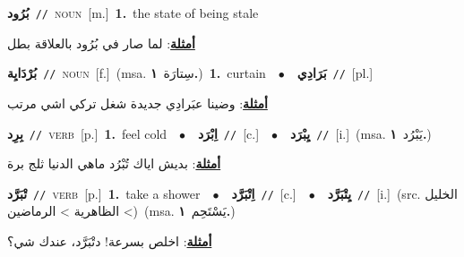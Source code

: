 \documentclass[10pt,a4paper,twoside]{article} %
\begin{document}
\begin{multicols}{2}
{\setlength\topsep{0pt}\textbf{\foreignlanguage{arabic}{بُرُود}}\ {\color{gray}\texttt{//}\color{black}}\ \textsc{noun}\ [m.]\ \textbf{1.}~the state of being stale\  \begin{flushright}\color{gray}\foreignlanguage{arabic}{\textbf{\underline{\foreignlanguage{arabic}{أمثلة}}}: لما صار في بُرُود بالعلاقة بطل}\end{flushright}\color{black}} \vspace{2mm}

{\setlength\topsep{0pt}\textbf{\foreignlanguage{arabic}{بُرْدَايِة}}\ {\color{gray}\texttt{//}\color{black}}\ \textsc{noun}\ [f.]\ \color{gray}(msa. \foreignlanguage{arabic}{سِتارَة}~\foreignlanguage{arabic}{\textbf{١.}})\color{black}\ \textbf{1.}~curtain\ \ $\bullet$\ \ \setlength\topsep{0pt}\textbf{\foreignlanguage{arabic}{بَرَادِي}}\ {\color{gray}\texttt{//}\color{black}}\ [pl.]\  \begin{flushright}\color{gray}\foreignlanguage{arabic}{\textbf{\underline{\foreignlanguage{arabic}{أمثلة}}}: وضينا عبَرادِي جديدة شغل تركي اشي مرتب}\end{flushright}\color{black}} \vspace{2mm}

{\setlength\topsep{0pt}\textbf{\foreignlanguage{arabic}{بِرِد}}\ {\color{gray}\texttt{//}\color{black}}\ \textsc{verb}\ [p.]\ \textbf{1.}~feel cold\ \ $\bullet$\ \ \setlength\topsep{0pt}\textbf{\foreignlanguage{arabic}{اِبْرَد}}\ {\color{gray}\texttt{//}\color{black}}\ [c.]\ \ $\bullet$\ \ \setlength\topsep{0pt}\textbf{\foreignlanguage{arabic}{يِبْرَد}}\ {\color{gray}\texttt{//}\color{black}}\ [i.]\ \color{gray}(msa. \foreignlanguage{arabic}{يَبْرُد}~\foreignlanguage{arabic}{\textbf{١.}})\color{black}\  \begin{flushright}\color{gray}\foreignlanguage{arabic}{\textbf{\underline{\foreignlanguage{arabic}{أمثلة}}}: بديش اياك تُبْرُد ماهي الدنيا ثلج برة}\end{flushright}\color{black}} \vspace{2mm}

{\setlength\topsep{0pt}\textbf{\foreignlanguage{arabic}{تْبَرَّد}}\ {\color{gray}\texttt{//}\color{black}}\ \textsc{verb}\ [p.]\ \textbf{1.}~take a shower\ \ $\bullet$\ \ \setlength\topsep{0pt}\textbf{\foreignlanguage{arabic}{اِتْبَرَّد}}\ {\color{gray}\texttt{//}\color{black}}\ [c.]\ \ $\bullet$\ \ \setlength\topsep{0pt}\textbf{\foreignlanguage{arabic}{يِتْبَرَّد}}\ {\color{gray}\texttt{//}\color{black}}\ [i.]\ (src. \color{gray}\foreignlanguage{arabic}{الخليل > الظاهرية > الرماضين}\color{black})\ \color{gray}(msa. \foreignlanguage{arabic}{يَسْتَحِم}~\foreignlanguage{arabic}{\textbf{١.}})\color{black}\  \begin{flushright}\color{gray}\foreignlanguage{arabic}{\textbf{\underline{\foreignlanguage{arabic}{أمثلة}}}: اخلص بسرعة! دتْبَرَّد، عندك شي؟}\end{flushright}\color{black}} \vspace{2mm}


\end{multicols}
\end{document}
